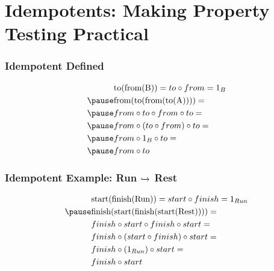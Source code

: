 \documentclass{beamer}
\begin{document}
\section{Idempotents: Making Property Testing Practical}
\begin{frame}[fragile]
\frametitle{Idempotent Defined}
\medskip
\begin{equation*}
\begin{aligned}
& \text{to(from(B))} = to \circ from = 1_B \\ \pause
& \text{from(to(from(to(A))))} = \\ \pause
& from \circ to \circ from \circ to = \\ \pause
& from \circ (to \circ from) \circ to = \\ \pause
& from \circ 1_B \circ to = \\ \pause
& from \circ to \\
\end{aligned}
\end{equation*}
\end{frame}

\begin{frame}[fragile]
\frametitle{Idempotent Example: Run {$\xhookrightarrow{}$} Rest}
\medskip
\begin{equation*}
\begin{aligned}
& \text{start(finish(Run))} = start \circ finish = 1_{Run} \\ \pause
& \text{finish(start(finish(start(Rest))))} = \\
& finish \circ start \circ finish \circ start = \\
& finish \circ (start \circ finish) \circ start = \\
& finish \circ (1_{Run}) \circ start = \\
& finish \circ start \\
\end{aligned}
\end{equation*}
\end{frame}
\end{document}
